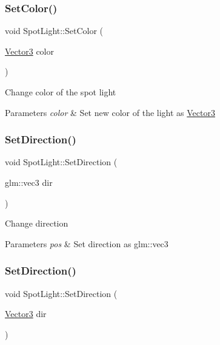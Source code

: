 \subsubsection{\texorpdfstring{SetColor()}{SetColor()}\hspace{0.1cm}{\footnotesize\ttfamily [2/2]}}
{\footnotesize\ttfamily void Spot\+Light\+::\+Set\+Color (\begin{DoxyParamCaption}\item[{\mbox{\hyperlink{struct_vector3}{Vector3}}}]{color }\end{DoxyParamCaption})}

Change color of the spot light 
\begin{DoxyParams}{Parameters}
{\em color} & Set new color of the light as \mbox{\hyperlink{struct_vector3}{Vector3}} \\
\hline
\end{DoxyParams}
\mbox{\label{class_spot_light_aef4f6402b243b594deb090d5a6fc8bac}} 
\subsubsection{\texorpdfstring{SetDirection()}{SetDirection()}\hspace{0.1cm}{\footnotesize\ttfamily [1/2]}}
{\footnotesize\ttfamily void Spot\+Light\+::\+Set\+Direction (\begin{DoxyParamCaption}\item[{glm\+::vec3}]{dir }\end{DoxyParamCaption})}

Change direction 
\begin{DoxyParams}{Parameters}
{\em pos} & Set direction as glm\+::vec3 \\
\hline
\end{DoxyParams}
\mbox{\label{class_spot_light_ae4655dfcad039a909ccef93f3b379261}} 
\subsubsection{\texorpdfstring{SetDirection()}{SetDirection()}\hspace{0.1cm}{\footnotesize\ttfamily [2/2]}}
{\footnotesize\ttfamily void Spot\+Light\+::\+Set\+Direction (\begin{DoxyParamCaption}\item[{\mbox{\hyperlink{struct_vector3}{Vector3}}}]{dir }\end{DoxyParamCaption})}

